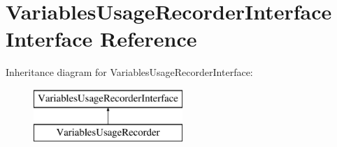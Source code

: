 \hypertarget{interface_pes_1_1_view_1_1_recorder_1_1_variables_usage_recorder_interface}{}\section{Variables\+Usage\+Recorder\+Interface Interface Reference}
\label{interface_pes_1_1_view_1_1_recorder_1_1_variables_usage_recorder_interface}
Inheritance diagram for Variables\+Usage\+Recorder\+Interface\+:\begin{figure}[H]
\begin{center}
\leavevmode
\includegraphics[height=2.000000cm]{interface_pes_1_1_view_1_1_recorder_1_1_variables_usage_recorder_interface}
\end{center}
\end{figure}
